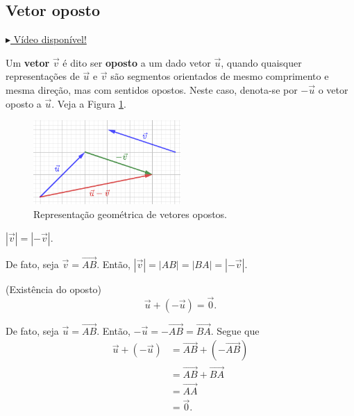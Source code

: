 \subsection{Vetor oposto}

\begin{flushright}
  \href{https://archive.org/details/vetor-oposto}{$\blacktriangleright$ Vídeo disponível!}
\end{flushright}

Um \textbf{vetor} $\vec{v}$ é dito ser \textbf{oposto} a um dado vetor $\vec{u}$, quando quaisquer representações de $\vec{u}$ e $\vec{v}$ são segmentos orientados de mesmo comprimento e mesma direção, mas com sentidos opostos. Neste caso, denota-se por $-\vec{u}$ o vetor oposto a $\vec{u}$. Veja a Figura \ref{fig:voposto}.

\begin{figure}[H]
  \centering
  \includegraphics[width=0.5\textwidth]{./cap_vetor/dados/fig_voposto/fig_voposto}
  \caption{Representação geométrica de vetores opostos.}
  \label{fig:voposto}
\end{figure}

\begin{obs}
  $|\vec{v}| = |-\vec{v}|$.

  De fato, seja $\vec{v} = \overrightarrow{AB}$. Então, $|\vec{v}| = |AB| = |BA| = |-\vec{v}|$.
\end{obs}

\begin{obs}(Existência do oposto)
  \begin{equation}
    \vec{u} + \left(-\vec{u}\right) = \vec{0}.
  \end{equation}

  De fato, seja $\vec{u} = \overrightarrow{AB}$. Então, $-\vec{u} = -\overrightarrow{AB} = \overrightarrow{BA}$. Segue que
  \begin{align}
    \vec{u} + \left(-\vec{u}\right) &= \overrightarrow{AB} + \left(-\overrightarrow{AB}\right) \\
                                    &= \overrightarrow{AB} + \overrightarrow{BA} \\
                                    &= \overrightarrow{AA} \\
                                    &= \vec{0}.
  \end{align}
\end{obs}

